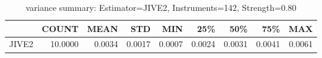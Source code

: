 \begin{table}[ht]
\centering
\caption{variance summary: Estimator=JIVE2, Instruments=142, Strength=0.80}
\begin{tabular}{lrrrrrrrr}
\toprule
 & COUNT & MEAN & STD & MIN & 25\% & 50\% & 75\% & MAX \\
\midrule
JIVE2 & 10.0000 & 0.0034 & 0.0017 & 0.0007 & 0.0024 & 0.0031 & 0.0041 & 0.0061 \\
\bottomrule
\end{tabular}
\end{table}
